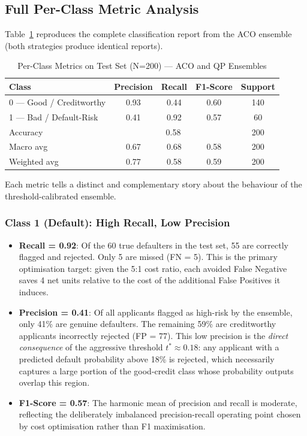 \documentclass[12pt,a4paper]{article}
\begin{document}
\subsection{Full Per-Class Metric Analysis}

Table~\ref{tab:perclass} reproduces the complete classification report from the
ACO ensemble (both strategies produce identical reports).

\begin{table}[H]
\centering
\caption{Per-Class Metrics on Test Set (N=200) --- ACO and QP Ensembles}
\label{tab:perclass}
\begin{tabular}{lcccc}
\toprule
\textbf{Class} & \textbf{Precision} & \textbf{Recall} & \textbf{F1-Score}
               & \textbf{Support} \\
\midrule
0 --- Good / Creditworthy & 0.93 & 0.44 & 0.60 & 140 \\
1 --- Bad / Default-Risk  & 0.41 & 0.92 & 0.57 &  60 \\
\midrule
Accuracy     & \multicolumn{3}{c}{0.58} & 200 \\
Macro avg    & 0.67 & 0.68 & 0.58 & 200 \\
Weighted avg & 0.77 & 0.58 & 0.59 & 200 \\
\bottomrule
\end{tabular}
\end{table}

Each metric tells a distinct and complementary story about the behaviour of the
threshold-calibrated ensemble.

\subsubsection{Class 1 (Default): High Recall, Low Precision}

\begin{itemize}
    \item \textbf{Recall = 0.92}: Of the 60 true defaulters in the test set, 55
    are correctly flagged and rejected. Only 5 are missed (FN = 5). This is the
    primary optimisation target: given the 5:1 cost ratio, each avoided False
    Negative saves 4 net units relative to the cost of the additional False
    Positives it induces.

    \item \textbf{Precision = 0.41}: Of all applicants flagged as high-risk by
    the ensemble, only 41\% are genuine defaulters. The remaining 59\% are
    creditworthy applicants incorrectly rejected (FP = 77). This low precision
    is the \textit{direct consequence} of the aggressive threshold
    $t^* \approx 0.18$: any applicant with a predicted default probability
    above 18\% is rejected, which necessarily captures a large portion of
    the good-credit class whose probability outputs overlap this region.

    \item \textbf{F1-Score = 0.57}: The harmonic mean of precision and recall
    is moderate, reflecting the deliberately imbalanced precision-recall
    operating point chosen by cost optimisation rather than F1 maximisation.
\end{itemize}
\end{document}
